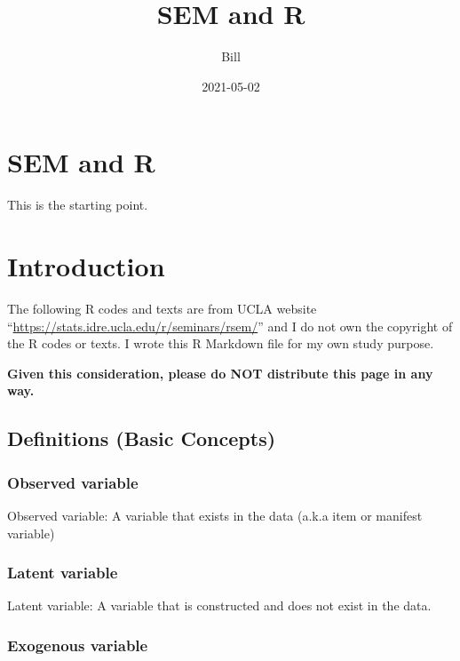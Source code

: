 \documentclass[]{book}
\title{SEM and R}
\author{Bill}
\date{2021-05-02}
\begin{document}
\maketitle

{
\setcounter{tocdepth}{1}
\tableofcontents
}
\hypertarget{sem-and-r}{%
\chapter{SEM and R}\label{sem-and-r}}

This is the starting point.

\hypertarget{intro}{%
\chapter{Introduction}\label{intro}}

The following R codes and texts are from UCLA website ``\url{https://stats.idre.ucla.edu/r/seminars/rsem/}'' and I do not own the copyright of the R codes or texts. I wrote this R Markdown file for my own study purpose.

\textbf{Given this consideration, please do NOT distribute this page in any way.}

\hypertarget{definitions-basic-concepts}{%
\section{Definitions (Basic Concepts)}\label{definitions-basic-concepts}}

\hypertarget{observed-variable}{%
\subsection{Observed variable}\label{observed-variable}}

Observed variable: A variable that exists in the data (a.k.a item or manifest variable)

\hypertarget{latent-variable}{%
\subsection{Latent variable}\label{latent-variable}}

Latent variable: A variable that is constructed and does not exist in the data.

\hypertarget{exogenous-variable}{%
\subsection{Exogenous variable}\label{exogenous-variable}}
\end{document}
